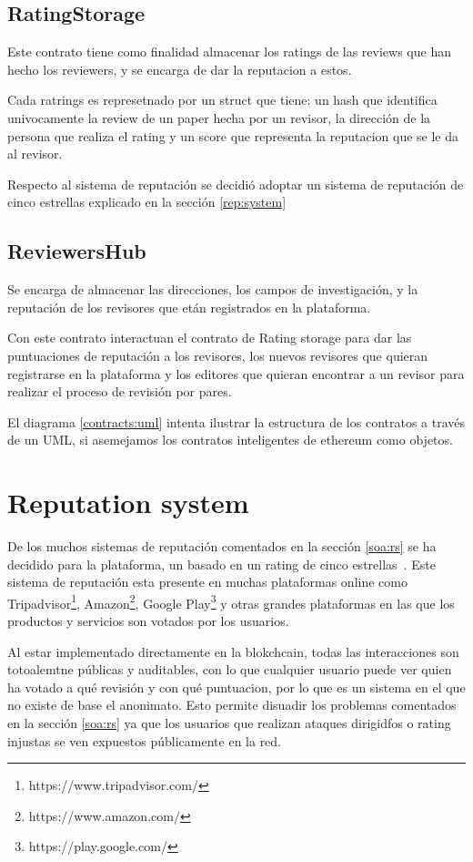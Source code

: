 \subsection*{RatingStorage}
Este contrato tiene como finalidad almacenar los ratings de las reviews que han
hecho los reviewers, y se encarga de dar la reputacion a estos.

Cada ratrings es represetnado por un struct que tiene: un hash que identifica
univocamente la review de un paper hecha por un revisor, la dirección de la
persona que realiza el rating y un score que representa la reputacion que se le
da al revisor.

Respecto al sistema de reputación se decidió adoptar un sistema de reputación de
cinco estrellas explicado en la sección \ref{rep:system}

\subsection*{ReviewersHub}

Se encarga de almacenar las direcciones, los campos de investigación, y la
reputación de los revisores que etán registrados en la plataforma.

Con este contrato interactuan el contrato de Rating storage para dar las
puntuaciones de reputación a los revisores, los nuevos revisores que quieran
registrarse en la plataforma y los editores que quieran encontrar a un revisor
para realizar el proceso de revisión por pares.


El diagrama \ref{contracts:uml} intenta ilustrar la estructura de los contratos
a través de un UML, si asemejamos los contratos inteligentes de ethereum como
objetos.


\section{Reputation system}

De los muchos sistemas de reputación comentados en la sección \ref{soa:rs} se ha
decidido para la plataforma, un basado en un rating de cinco
estrellas~\cite{kinateder2003architecture}. Este sistema de reputación esta
presente en muchas plataformas online como
Tripadvisor\footnote{https://www.tripadvisor.com/},
Amazon\footnote{https://www.amazon.com/}, Google
Play\footnote{https://play.google.com/} y otras grandes plataformas en las que
los productos y servicios son votados por los usuarios.

Al estar implementado directamente en la blokchcain, todas las interacciones son
totoalemtne públicas y auditables, con lo que cualquier usuario puede ver quien
ha votado a qué revisión y con qué puntuacion, por lo que es un sistema en el
que no existe de base el anonimato. Esto permite disuadir los problemas
comentados en la sección \ref{soa:rs} ya que los usuarios que realizan ataques
dirigidfos o rating injustas se ven expuestos públicamente en la red.

